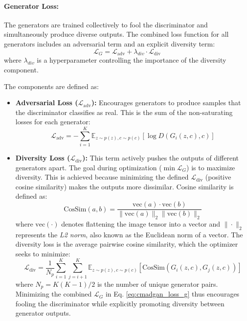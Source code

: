 \paragraph{Generator Loss:}
The generators are trained collectively to fool the discriminator and simultaneously produce diverse outputs. The combined loss function for all generators includes an adversarial term and an explicit diversity term:
\begin{equation}
\label{eq:cmadgan_loss_g}
\mathcal{L}_G = \mathcal{L}_{\text{adv}} + \lambda_{div} \cdot \mathcal{L}_{\text{div}}
\end{equation}
where \(\lambda_{div}\) is a hyperparameter controlling the importance of the diversity component.

The components are defined as:
\begin{itemize}
    \item \textbf{Adversarial Loss ($\mathcal{L}_{\text{adv}}$):} Encourages generators to produce samples that the discriminator classifies as real. This is the sum of the non-saturating losses for each generator:
    \begin{equation}
    \label{eq:cmadgan_loss_g_adv}
    \mathcal{L}_{\text{adv}} = - \sum_{i=1}^{K} \mathbb{E}_{z \sim p(z), c \sim p(c)} [\log D(G_i(z, c), c)]
    \end{equation}
    \item \textbf{Diversity Loss ($\mathcal{L}_{\text{div}}$):} This term actively pushes the outputs of different generators apart. The goal during optimization ($\min \mathcal{L}_G$) is to maximize diversity. This is achieved because minimizing the defined \(\mathcal{L}_{\text{div}}\) (positive cosine similarity) makes the outputs more dissimilar. Cosine similarity is defined as:
    \begin{equation}
    \label{eq:cmadgan_cossim}
    \text{CosSim}(a, b) = \frac{\text{vec}(a) \cdot \text{vec}(b)}{\|\text{vec}(a)\|_2 \|\text{vec}(b)\|_2}
    \end{equation}
    where $\text{vec}(\cdot)$ denotes flattening the image tensor into a vector and $\|\cdot\|_2$ represents the \textit{L2 norm}, also known as the Euclidean norm of a vector. The diversity loss is the average pairwise cosine similarity, which the optimizer seeks to minimize:
    \begin{equation}
    \label{eq:cmadgan_loss_g_div}
    \mathcal{L}_{\text{div}} = \frac{1}{N_p} \sum_{i=1}^{K} \sum_{j=i+1}^{K} \mathbb{E}_{z \sim p(z), c \sim p(c)} [\text{CosSim}(G_i(z, c), G_j(z, c))]
    \end{equation}
    where $N_p = K(K-1)/2$ is the number of unique generator pairs. Minimizing the combined $\mathcal{L}_G$ in Eq. \ref{eq:cmadgan_loss_g} thus encourages fooling the discriminator while explicitly promoting diversity between generator outputs.
\end{itemize}
\newpage
